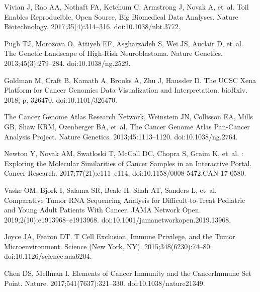 \documentclass[10pt,letterpaper]{article}
\begin{document}
\begin{thebibliography}{10}

Vivian J, Rao AA, Nothaft FA, Ketchum C, Armstrong J, Novak A, et~al.
\newblock Toil Enables Reproducible, Open Source, Big Biomedical Data Analyses.
\newblock Nature Biotechnology. 2017;35(4):314--316.
\newblock doi:{10.1038/nbt.3772}.

Pugh TJ, Morozova O, Attiyeh EF, Asgharzadeh S, Wei JS, Auclair D, et~al.
\newblock The Genetic Landscape of High-Risk Neuroblastoma.
\newblock Nature Genetics. 2013;45(3):279--284.
\newblock doi:{10.1038/ng.2529}.

Goldman M, Craft B, Kamath A, Brooks A, Zhu J, Haussler D.
\newblock The {{UCSC Xena Platform}} for Cancer Genomics Data Visualization and
Interpretation.
\newblock bioRxiv. 2018; p. 326470.
\newblock doi:{10.1101/326470}.

{The Cancer Genome Atlas Research Network}, Weinstein JN, Collisson EA, Mills
GB, Shaw KRM, Ozenberger BA, et~al.
\newblock The {{Cancer Genome Atlas Pan}}-{{Cancer}} Analysis Project.
\newblock Nature Genetics. 2013;45:1113--1120.
\newblock doi:{10.1038/ng.2764}.

Newton Y, Novak AM, Swatloski T, McColl DC, Chopra S, Graim K, et~al.
: {{Exploring}} the {{Molecular Similarities}} of
{{Cancer Samples}} in an {{Interactive Portal}}.
\newblock Cancer Research. 2017;77(21):e111--e114.
\newblock doi:{10.1158/0008-5472.CAN-17-0580}.

Vaske OM, Bjork I, Salama SR, Beale H, Shah AT, Sanders L, et~al.
\newblock Comparative {{Tumor RNA Sequencing Analysis}} for
{{Difficult}}-to-{{Treat Pediatric}} and {{Young Adult Patients With
		Cancer}}.
\newblock JAMA Network Open. 2019;2(10):e1913968--e1913968.
\newblock doi:{10.1001/jamanetworkopen.2019.13968}.

Joyce JA, Fearon DT.
\newblock T Cell Exclusion, Immune Privilege, and the Tumor Microenvironment.
\newblock Science (New York, NY). 2015;348(6230):74--80.
\newblock doi:{10.1126/science.aaa6204}.

Chen DS, Mellman I.
\newblock Elements of Cancer Immunity and the Cancer\textendash{}Immune Set
Point.
\newblock Nature. 2017;541(7637):321--330.
\newblock doi:{10.1038/nature21349}.


\end{thebibliography}
\end{document}

